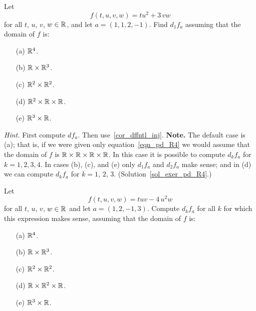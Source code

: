 \begin{exer}\label{exer_pd_R4}   Let
 \begin{equation}\label{eqn_pd_R4}
        f(t,u,v,w) = tu^2 + 3\,vw
 \end{equation}
for all $t$, $u$, $v$, $w \in \mathbb{R}$, and let $a = (1,1,2,-1)$.  Find $d_1f_a$ assuming that the
domain of $f$ is:
 \begin{enumerate}
  \item[(a)] $\mathbb{R}^4$.
  \item[(b)] $\mathbb{R} \times \mathbb{R}^3$.
  \item[(c)] $\mathbb{R}^2 \times \mathbb{R}^2$.
  \item[(d)] $\mathbb{R}^2 \times \mathbb{R} \times \mathbb{R}$.
  \item[(e)] $\mathbb{R}^3 \times \mathbb{R}$.
 \end{enumerate}
\emph{Hint.}  First compute $df_a$.  Then use~\ref{cor_dffntl_inj}.  \textbf{Note.}  The
default case is (a); that is, if we were given only equation~\eqref{eqn_pd_R4} we would assume
that the domain of $f$ is $\mathbb{R} \times \mathbb{R} \times \mathbb{R} \times \mathbb{R}$.  In this case it is possible to
compute $d_kf_a$ for $k = 1,2,3, 4$.  In cases (b), (c), and (e) only $d_1f_a$ and $d_2f_a$
make sense; and in (d) we can compute $d_kf_a$ for $k = 1$, $2$, $3$.
(Solution~\ref{sol_exer_pd_R4}.)
\end{exer}

\begin{prob}  Let
  \[ f(t,u,v,w) = tuv - 4\,u^2w \]
for all $t$, $u$, $v$, $w \in \mathbb{R}$ and let $a = (1,2,-1,3)$.  Compute $d_kf_a$ for all $k$ for
which this expression makes sense, assuming that the domain of $f$ is:
 \begin{enumerate}
  \item[(a)] $\mathbb{R}^4$.
  \item[(b)] $\mathbb{R} \times \mathbb{R}^3$.
  \item[(c)] $\mathbb{R}^2 \times \mathbb{R}^2$.
  \item[(d)] $\mathbb{R} \times \mathbb{R}^2 \times \mathbb{R}$.
  \item[(e)] $\mathbb{R}^3 \times \mathbb{R}$.
 \end{enumerate}
\end{prob}

